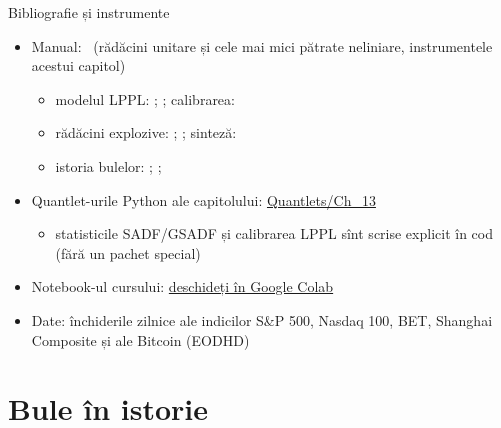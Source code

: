 \begin{frame}{Bibliografie și instrumente}
\itemsize{\small}
\begin{itemize}
    \item Manual: \ (rădăcini unitare și cele mai mici pătrate neliniare, instrumentele acestui capitol)
    \begin{itemize}
        \item modelul LPPL: ; ; calibrarea: 
        \item rădăcini explozive: ; ; sinteză: 
        \item istoria bulelor: ; ; 
    \end{itemize}
    \item Quantlet-urile Python ale capitolului: \href{https://github.com/danpele/Time-Series-Analysis/tree/main/Quantlets/Ch_13}{Quantlets/Ch\_13}
    \begin{itemize}
        \item statisticile SADF/GSADF și calibrarea LPPL sînt scrise explicit în cod (fără un pachet special)
    \end{itemize}
    \item Notebook-ul cursului: \href{\colaburl{notebooks/EN/chapter13_lecture_notebook.ipynb}}{deschideți în Google Colab}
    \item Date: închiderile zilnice ale indicilor S\&P 500, Nasdaq 100, BET, Shanghai Composite și ale Bitcoin (EODHD)
\end{itemize}
\end{frame}


\section{Bule în istorie}

